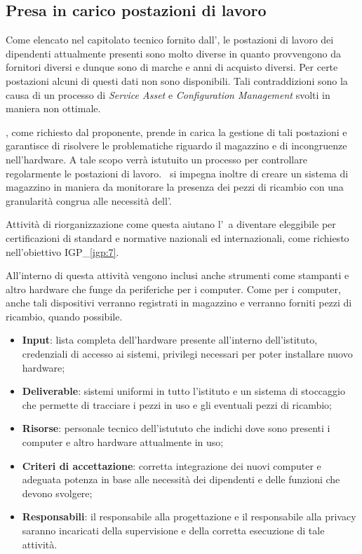 	\subsection{Presa in carico postazioni di lavoro}
	
		Come elencato nel capitolato tecnico fornito dall'\istituto, le postazioni di lavoro dei dipendenti attualmente presenti sono molto diverse in quanto provvengono da fornitori diversi e dunque sono di marche e anni di acquisto diversi.
		Per certe postazioni alcuni di questi dati non sono disponibili.
		Tali contraddizioni sono la causa di un processo di \textit{Service Asset} e \textit{Configuration Management} svolti in maniera non ottimale.
		
		\azienda, come richiesto dal proponente, prende in carica la gestione di tali postazioni e garantisce di risolvere le problematiche riguardo il magazzino e di incongruenze nell'hardware.
		A tale scopo verrà istutuito un processo per controllare regolarmente le postazioni di lavoro.
		\azienda~si impegna inoltre di creare un sistema di magazzino in maniera da monitorare la presenza dei pezzi di ricambio con una granularità congrua alle necessità dell'\istituto.
		
		Attività di riorganizzazione come questa aiutano l'\istituto~a diventare eleggibile per certificazioni di standard e normative nazionali ed internazionali, come richiesto nell'obiettivo {\color{pantone}IGP\_\ref{igp:7}}.
		
		All'interno di questa attività vengono inclusi anche strumenti come stampanti e altro hardware che funge da periferiche per i computer.
		Come per i computer, anche tali dispositivi verranno registrati in magazzino e verranno forniti pezzi di ricambio, quando possibile.
		
		\begin{itemize}[noitemsep]
			\renewcommand\labelitemi{--}
			\item \textbf{Input}: lista completa dell'hardware presente all'interno dell'istituto, credenziali di accesso ai sistemi, privilegi necessari per poter installare nuovo hardware;
			\item \textbf{Deliverable}: sistemi uniformi in tutto l'istituto e un sistema di stoccaggio che permette di tracciare i pezzi in uso e gli eventuali pezzi di ricambio;
			\item \textbf{Risorse}: personale tecnico dell'istututo che indichi dove sono presenti i computer e altro hardware attualmente in uso;
			\item \textbf{Criteri di accettazione}: corretta integrazione dei nuovi computer e adeguata potenza in base alle necessità dei dipendenti e delle funzioni che devono svolgere;
			\item \textbf{Responsabili}: il responsabile alla progettazione e il responsabile alla privacy saranno incaricati della supervisione e della corretta esecuzione di tale attività.
		\end{itemize}
		
